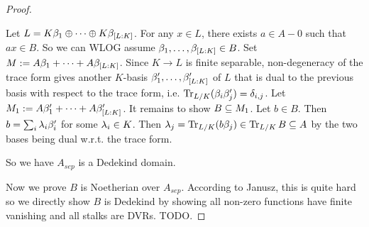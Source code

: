 \documentclass[./main.tex]{subfiles}
\begin{document}
\begin{proof}
\begin{lem}
    \begin{proof1}
      Let $L = K\beta_1 \oplus \cdots \oplus K\beta_{[L:K]}$.
      For any $x \in L$, there exists $a \in A\minus 0$ such that $ax \in B$. 
      So we can WLOG assume $\beta_1,\dots,\beta_{[L:K]} \in B$.
      Set $M := A\beta_1 + \cdots + A\beta_{[L:K]}$.
      Since $K \to L$ is finite separable, 
      non-degeneracy of the trace form gives another $K$-basis 
      $\beta_1',\dots,\beta_{[L:K]}'$ of $L$ that is 
      dual to the previous basis with respect to the trace form,
      i.e. $\operatorname{Tr}_{L/K}(\beta_i \beta'_j) = \delta_{i,j}$.
      Let $M_1 := A\beta'_1 + \cdots + A\beta'_{[L:K]}$.
      It remains to show $B \subseteq M_1$.
      Let $b \in B$. Then $b = \sum_{i}^{} \lambda_i \beta'_i$ for some $\lambda_i \in K$.
      Then $
        \lambda_j = \operatorname{Tr}_{L/K}(b \beta_j) \in \operatorname{Tr}_{L/K} B \subseteq A
      $ by the two bases being dual w.r.t. the trace form. 
    \end{proof1}
  \end{lem}
  So we have $A_{sep}$ is a Dedekind domain. 

  Now we prove $B$ is Noetherian over $A_{sep}$.
  According to Janusz, this is quite hard so 
  we directly show $B$ is Dedekind by showing 
  all non-zero functions have finite vanishing and 
  all stalks are DVRs. TODO.

\end{proof}
\end{document}

